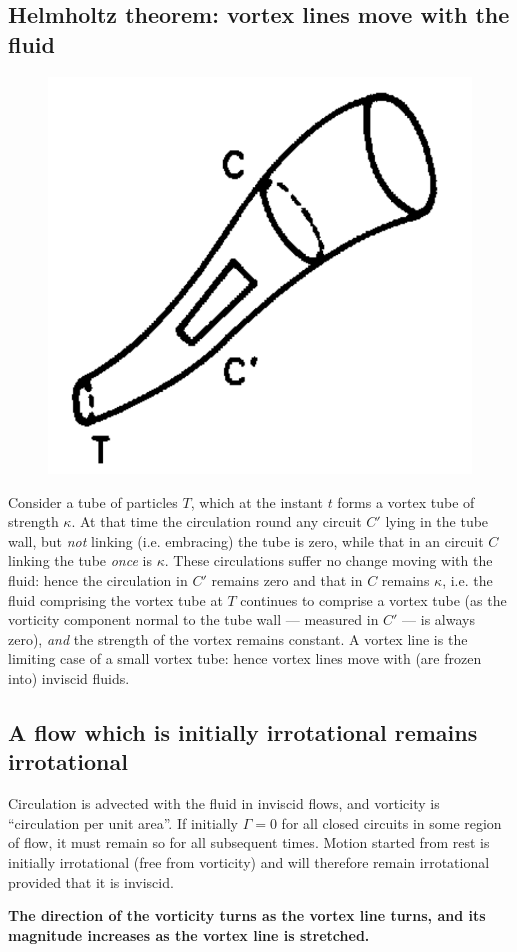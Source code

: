 \documentclass[10pt]{report}
\begin{document}
\subsection{Helmholtz theorem: vortex lines move with the fluid}

\begin{figure}
\centerline{\includegraphics[width=2.in]{Section45.pdf}}
\caption{ }
\label{fig3.5}
\end{figure}

Consider a tube of particles $T$, which at the instant $t$ forms a vortex tube
of strength $\kappa $. At that time the circulation round any circuit $C'$
lying in the tube wall, but \textit{not} linking (i.e. embracing) the tube is zero,
while that in an circuit $C$ linking the tube \textit{once} is $\kappa $. These
circulations suffer no change moving with the fluid: hence the circulation
in $C'$ remains zero and that in $C$ remains $\kappa $, i.e. the fluid
comprising the vortex tube at $T$ continues to comprise a vortex tube (as the
vorticity component normal to the tube wall --- measured in $C'$ --- is always
zero), \textit{and} the strength of the vortex remains constant. A vortex line is the
limiting case of a small vortex tube: hence vortex lines move with (are
frozen into) inviscid fluids.

\subsection{A flow which is initially irrotational remains irrotational}

Circulation is advected with the fluid in inviscid flows, and vorticity is
``circulation per unit area''. If initially $\Gamma = 0$ for all closed
circuits in some region of flow, it must remain so for all subsequent times.
Motion started from rest is initially irrotational (free from vorticity) and
will therefore remain irrotational provided that it is inviscid.

\begin{center}
\textbf{The direction of the vorticity turns as the vortex line turns, and
its magnitude increases as the vortex line is stretched.}
\end{center}
\end{document}
